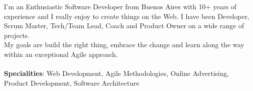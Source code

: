 
\begin{cvparagraph}
I'm an Enthusiastic Software Developer from Buenos Aires with 10+ years of experience and I really enjoy to create things on the Web. I have been Developer, Scrum Master, Tech/Team Lead, Coach and Product Owner on a wide range of projects.\\ My goals are build the right thing, embrace the change and learn along the way within an exceptional Agile approach.\\\\
\textbf{Specialities}: Web Development, Agile Methodologies, Online Advertising, Product Development, Software Architecture
\end{cvparagraph}



